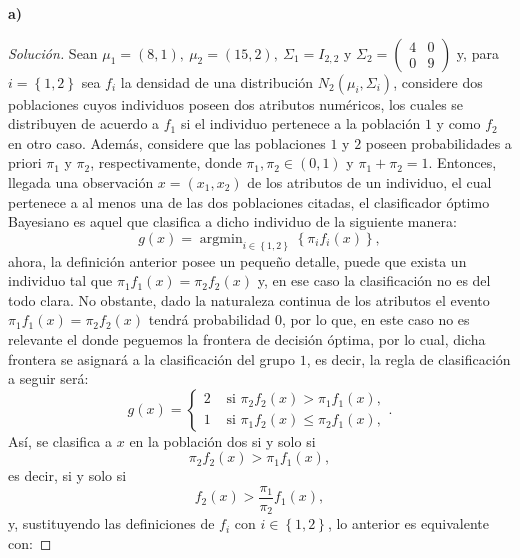\documentclass[10.5pt,notitlepage]{article}
\newenvironment{solucion}
  {\begin{proof}[Solución]}
  {\end{proof}}
\DeclareMathOperator{\argmin}{argmin}
\newcommand{\kis}[1]{\left\{ #1 \right\}}
\newcommand{\Matrix}[1]{\begin{pmatrix} #1 \end{pmatrix}}
\theoremstyle{plain}
\begin{document}
\begin{exo}

\end{exo}
\textbf{a)}
\begin{solucion}
Sean \(\mu_1 = (8,1),\ \mu_2 = (15,2),\ \Sigma_1 = I_{2,2}\) y \(\Sigma_{2} = \Matrix{4 & 0 \\ 0 & 9}\) y, para \(i = \kis{1, 2}\) sea \(f_{i}\) la densidad de una distribución \(N_{2}(\mu_i, \Sigma_i)\), considere dos poblaciones cuyos individuos poseen dos atributos numéricos, los cuales se distribuyen de acuerdo a \(f_1\) si el individuo pertenece a la población \(1\) y como \(f_2\) en otro caso. Además, considere que las poblaciones \(1\) y \(2\) poseen probabilidades a priori \(\pi_1\) y \(\pi_2\), respectivamente, donde \(\pi_1, \pi_2 \in (0,1)\) y \(\pi_1 + \pi_2 = 1\). Entonces, llegada una observación \(x = (x_1, x_2)\) de los atributos de un individuo, el cual pertenece a al menos una de las dos poblaciones citadas, el clasificador óptimo Bayesiano es aquel que clasifica a dicho individuo de la siguiente manera: 
\begin{equation*}
    g(x) = \argmin_{i \in \kis{1,2}}\kis{\pi_{i}f_{i}(x)}, 
\end{equation*}
ahora, la definición anterior posee un pequeño detalle, puede que exista un individuo tal que \(\pi_1f_{1}(x) = \pi_2f_{2}(x)\) y, en ese caso la clasificación no es del todo clara. No obstante, dado la naturaleza continua de los atributos el evento \(\pi_1f_{1}(x) = \pi_2f_{2}(x)\) tendrá probabilidad \(0\), por lo que, en este caso no es relevante el donde peguemos la frontera de decisión óptima, por lo cual, dicha frontera se asignará a la clasificación del grupo \(1\), es decir, la regla de clasificación a seguir será:  
\begin{equation}\label{lab.300}
    g(x) = \begin{cases}
2 & \text{ si } \pi_{2}f_{2}(x) >  \pi_{1}f_{1}(x), \\ 
1 & \text{ si } \pi_{1}f_{2}(x) \leq \pi_{2}f_{1}(x), 
\end{cases}.
\end{equation}
Así, se clasifica a \(x\) en la población dos si y solo si 
\begin{equation*}
    \pi_{2}f_{2}(x) >  \pi_{1}f_{1}(x),  
\end{equation*}
es decir, si y solo si 
\begin{equation*}
    f_{2}(x) >  \frac{\pi_{1}}{\pi_{2}}f_{1}(x),  
\end{equation*}
y, sustituyendo las definiciones de \(f_{i}\) con \(i \in \kis{1,2}\), lo anterior es equivalente con:

\end{solucion}
\end{document}

